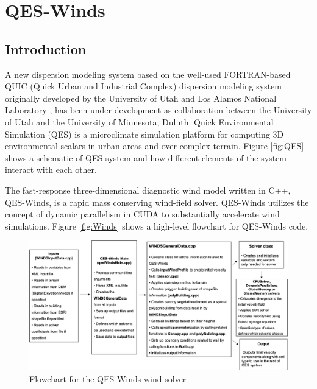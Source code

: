 \chapter{QES-Winds}

\section{Introduction}

A new dispersion modeling system based on the well-used FORTRAN-based QUIC (Quick Urban and Industrial Complex) dispersion modeling system originally developed by the University of Utah and Los Alamos National Laboratory \cite{brown2013quic}, has been under development as collaboration between the University of Utah and the University of Minnesota, Duluth. Quick Environmental Simulation (QES) is a microclimate simulation platform for computing 3D environmental scalars in urban areas and over complex terrain. Figure \ref{fig:QES} shows a schematic of QES system and how different elements of the system interact with each other.


The fast-response three-dimensional diagnostic wind model written in C++, QES-Winds, is a rapid mass conserving wind-field solver. QES-Winds utilizes the concept of dynamic parallelism in CUDA to substantially accelerate wind simulations. Figure \ref{fig:Winds} shows a high-level flowchart for QES-Winds code.

\begin{figure}[H]
\includegraphics[width=17cm]{Images/QES_flowchart.png}
\caption{Flowchart for the QES-Winds wind solver}
\end{figure}


